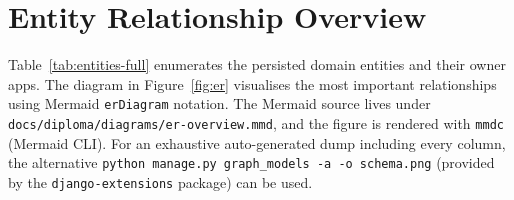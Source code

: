 \clearpage


\chapter{Entity Relationship Overview}
\label{app:er}

Table~\ref{tab:entities-full} enumerates the persisted domain entities and their owner apps. The diagram in Figure~\ref{fig:er} visualises the most important relationships using Mermaid \texttt{erDiagram} notation. The Mermaid source lives under \texttt{docs/diploma/diagrams/er-overview.mmd}, and the figure is rendered with \texttt{mmdc} (Mermaid CLI). For an exhaustive auto-generated dump including every column, the alternative \texttt{python manage.py graph\_models -a -o schema.png} (provided by the \texttt{django-extensions} package) can be used.

